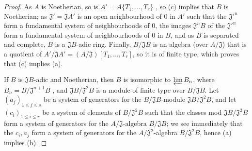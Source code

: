 \begin{proof}
As $A$ is Noetherian, so is $A'=A\{T_1,\dots,T_r\}$ , so
(c) implies that $B$ is Noetherian; as $\mathfrak{J}'=\mathfrak{J}A'$ is an open neighbourhood
of $0$ in $A'$ such that the ${\mathfrak{J}'}^n$ form a fundamental system of neighbourhoods of
$0$, the images $\mathfrak{J}^n B$ of the ${\mathfrak{J}'}^n$ form a fundamental system of
neighbourhoods of $0$ in $B$, and as $B$ is separated and complete, $B$ is a $\mathfrak{J}B$-adic
  ring. Finally, $B/\mathfrak{J}B$ is an algebra (over $A/\mathfrak{J}$) that is a quotient of
$A'/\mathfrak{J}A'=(A/\mathfrak{J})[T_1,\dots,T_r]$, so it is of finite type, which proves that
(c) implies (a).

If $B$ is $\mathfrak{J}B$-adic and Noetherian, then $B$ is isomorphic to $\varprojlim B_n$, where
$B_n=B/\mathfrak{J}^{n+1}B$ , and $\mathfrak{J}B/\mathfrak{J}^2 B$
is a module of finite type over $B/\mathfrak{J}B$. Let $(a_j)_{1\leq j\leq s}$ be a
system of generators for the $B/\mathfrak{J}B$-module $\mathfrak{J}B/\mathfrak{J}^2 B$, and let
$(c_i)_{1\leq i\leq r}$ be a system of elements of $B/\mathfrak{J}^2 B$ such that the
classes
mod $\mathfrak{J}B/\mathfrak{J}^2 B$ form a system of generators for the $A/\mathfrak{J}$-algebra
$B/\mathfrak{J}B$; we see immediately that the $c_i, a_j$ form a system of generators for the
$A/\mathfrak{J}^2$-algebra $B/\mathfrak{J}^2 B$, hence (a) implies (b).


\end{proof}

